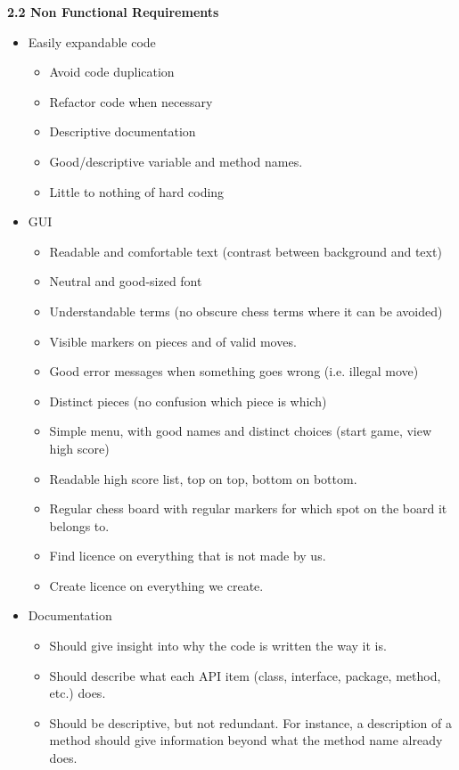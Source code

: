 \documentclass{article}
\begin{document}
\begin{flushleft}

\textbf{2.2	Non Functional Requirements}
\begin{itemize}
	\item Easily expandable code
	\begin{itemize}
		\item Avoid code duplication
		\item Refactor code when necessary 
		\item Descriptive documentation
		\item Good/descriptive variable and method names.
		\item Little to nothing of hard coding
	\end{itemize}
	\item GUI
	\begin{itemize}
		\item Readable and comfortable text (contrast between background and text)
		\item Neutral and good-sized font
		\item Understandable terms (no obscure chess terms where it can be avoided)
		\item Visible markers on pieces and of valid moves.
		\item Good error messages when something goes wrong (i.e. illegal move)
		\item Distinct pieces (no confusion which piece is which)
		\item Simple menu, with good names and distinct choices (start game, view high score)
		\item Readable high score list, top on top, bottom on bottom.
		\item Regular chess board with regular markers for which spot on the board it belongs to.
		\item Find licence on everything that is not made by us.
		\item Create licence on everything we create.
	\end{itemize}
	\item Documentation
	\begin{itemize}
		\item Should give insight into why the code is written the way it is.
		\item Should describe what each API item (class, interface, package, method, etc.) does.
		\item Should be descriptive, but not redundant. For instance, a description of a method should give information beyond what the method name already does.

\end{itemize}
\end{itemize}
\end{flushleft}
\end{document}
